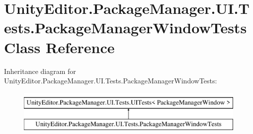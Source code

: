 \hypertarget{class_unity_editor_1_1_package_manager_1_1_u_i_1_1_tests_1_1_package_manager_window_tests}{}\section{Unity\+Editor.\+Package\+Manager.\+U\+I.\+Tests.\+Package\+Manager\+Window\+Tests Class Reference}
\label{class_unity_editor_1_1_package_manager_1_1_u_i_1_1_tests_1_1_package_manager_window_tests}
Inheritance diagram for Unity\+Editor.\+Package\+Manager.\+U\+I.\+Tests.\+Package\+Manager\+Window\+Tests\+:\begin{figure}[H]
\begin{center}
\leavevmode
\includegraphics[height=2.000000cm]{class_unity_editor_1_1_package_manager_1_1_u_i_1_1_tests_1_1_package_manager_window_tests}
\end{center}
\end{figure}
